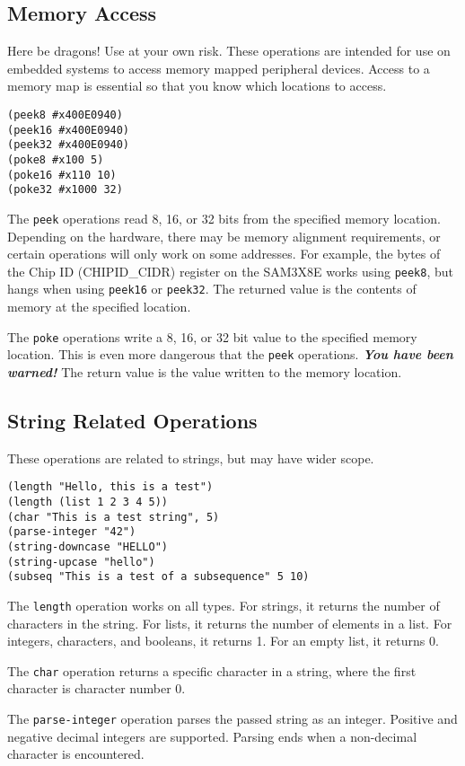 \documentclass[10pt, openany]{book}
\newcommand{\function}[1]{\texttt{#1}}
\begin{document}
\subsection{Memory Access}
Here be dragons!  Use at your own risk.  These operations are intended for use on embedded systems to access memory mapped peripheral devices.  Access to a memory map is essential so that you know which locations to access.
\begin{lstlisting}
(peek8 #x400E0940)
(peek16 #x400E0940)
(peek32 #x400E0940)
(poke8 #x100 5)
(poke16 #x110 10)
(poke32 #x1000 32)
\end{lstlisting}

The \function{peek} operations read 8, 16, or 32 bits from the specified memory location.  Depending on the hardware, there may be memory alignment requirements, or certain operations will only work on some addresses.  For example, the bytes of the Chip ID (CHIPID\_CIDR) register on the SAM3X8E works using \function{peek8}, but hangs when using \function{peek16} or \function{peek32}.  The returned value is the contents of memory at the specified location.

The \function{poke} operations write a 8, 16, or 32 bit value to the specified memory location.  This is even more dangerous that the \function{peek} operations.  \textbf{\textit{You have been warned!}}  The return value is the value written to the memory location.

\subsection{String Related Operations}
These operations are related to strings, but may have wider scope.
\begin{lstlisting}
(length "Hello, this is a test")
(length (list 1 2 3 4 5))
(char "This is a test string", 5)
(parse-integer "42")
(string-downcase "HELLO")
(string-upcase "hello")
(subseq "This is a test of a subsequence" 5 10)
\end{lstlisting}

The \function{length} operation works on all types.  For strings, it returns the number of characters in the string.  For lists, it returns the number of elements in a list.  For integers, characters, and booleans, it returns 1.  For an empty list, it returns 0.

The \function{char} operation returns a specific character in a string, where the first character is character number 0.

The \function{parse-integer} operation parses the passed string as an integer.  Positive and negative decimal integers are supported.  Parsing ends when a non-decimal character is encountered.
\end{document}
